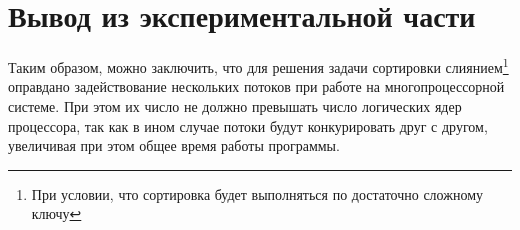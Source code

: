 \section{Вывод из экспериментальной части}

Таким образом, можно заключить, что для решения задачи сортировки слиянием\footnote{При условии, что сортировка будет выполняться по достаточно сложному ключу} оправдано задействование нескольких потоков при работе на многопроцессорной системе. При этом их число не должно превышать число логических ядер процессора, так как в ином случае потоки будут конкурировать друг с другом, увеличивая при этом общее время работы программы.
